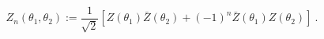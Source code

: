 \begin{equation}
Z_{n}(\theta _{1},\theta _{2}):=\frac{1}{\sqrt{2}}\left[ Z(\theta _{1})\bar{Z%
}(\theta _{2})+(-1)^{n}\bar{Z}(\theta _{1})Z(\theta _{2})\right] ~.
\label{breather}
\end{equation}%
